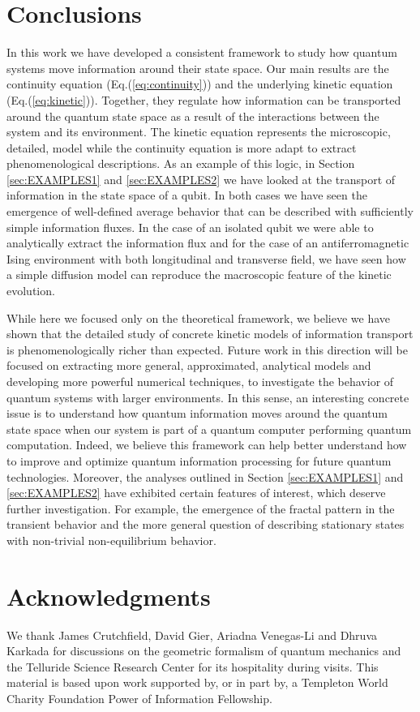 \documentclass[draft,nofootinbib,pre,twocolumn,showpacs,showkeys,preprintnumbers,floatfix]{revtex4-1}
\newcommand{\1}{\mathbbm{1}}
\begin{document}
\section{Conclusions}
\label{sec:FINAL}

In this work we have developed a consistent framework to study how quantum systems move
information around their state space. Our main results are the continuity equation (Eq.(\ref{eq:continuity}))
and the underlying kinetic equation (Eq.(\ref{eq:kinetic})). Together, they regulate how information
can be transported around the quantum state space as a result of the interactions between the
system and its environment. The kinetic equation represents the microscopic, detailed, model 
while the continuity equation is more adapt to extract phenomenological descriptions. 
As an example of this logic, in Section \ref{sec:EXAMPLES1} and \ref{sec:EXAMPLES2} we have looked
at the transport of information in the state space of a qubit. In both cases we have seen the emergence
of well-defined average behavior that can be described with sufficiently simple information 
fluxes. In the case of an isolated qubit we were able to analytically extract the information flux and
for the case of an antiferromagnetic Ising environment with both longitudinal and transverse field, we
have seen how a simple diffusion model can reproduce the macroscopic feature of the kinetic evolution.

While here we focused only on the theoretical framework, we believe we have shown that the 
detailed study of concrete kinetic models of information transport is phenomenologically richer than expected.
Future work in this direction will be focused on extracting more general, approximated, analytical models and 
developing more powerful numerical techniques, to investigate the behavior of quantum systems with larger 
environments. In this sense, an interesting concrete issue is to understand how quantum information moves around the 
quantum state space when our system is part of a quantum computer performing quantum computation.
Indeed, we believe this framework can help better understand how to improve and optimize quantum information
processing for future quantum technologies.
Moreover, the analyses outlined in Section \ref{sec:EXAMPLES1} and \ref{sec:EXAMPLES2}
have exhibited certain features of interest, which deserve further investigation. For example, the emergence of 
the fractal pattern in the transient behavior and the more general question of describing stationary states
with non-trivial non-equilibrium behavior.


\section*{Acknowledgments}
\label{sec:acknowledgments}

We thank James Crutchfield, David Gier, Ariadna Venegas-Li and Dhruva Karkada
for discussions on the geometric formalism of quantum mechanics and the Telluride
Science Research Center for its hospitality during visits.  This material is
based upon work supported by, or in part by, a Templeton World Charity
Foundation Power of Information Fellowship.

\newpage

\end{document}

